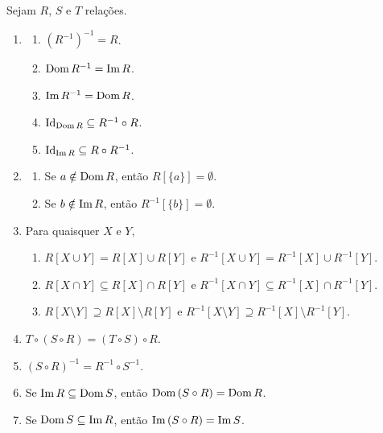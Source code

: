 \begin{proposition} \label{prop.set:relacoes}
    Sejam $R$, $S$ e $T$ relações.
        \begin{enumerate}[leftmargin=*, align=left, label=\textbf{(\alph*)}]
            \item 
                \begin{enumerate}[label=\roman*.]
                    \item $(R^{-1})^{-1} = R$.
                    \item $\operatorname{Dom} R^{-1} = \operatorname{Im} R$.
                    \item $\operatorname{Im} R^{-1} = \operatorname{Dom} R$.
                    \item $\operatorname{Id}_{\operatorname{Dom} R} \subseteq R^{-1} \circ R$.
                    \item $\operatorname{Id}_{\operatorname{Im} R} \subseteq R \circ R^{-1}$.
                \end{enumerate}
            \item 
                \begin{enumerate}[label=\roman*.]
                    \item Se $a \notin \operatorname{Dom} R$, então $R[\{a\}] = \emptyset$.
                    \item Se $b \notin \operatorname{Im} R$, então $R^{-1}[\{b\}] = \emptyset$.
                \end{enumerate}
            \item Para quaisquer $X$ e $Y$,
                \begin{enumerate}[label=\roman*.]
                    \item $R[X \cup Y] = R[X] \cup R[Y]$ e $R^{-1}[X \cup Y] = R^{-1}[X] \cup R^{-1}[Y]$.
                    \item $R[X \cap Y] \subseteq R[X] \cap R[Y]$ e $R^{-1}[X \cap Y] \subseteq R^{-1}[X] \cap R^{-1}[Y]$.
                    \item $R[X \setminus Y] \supseteq R[X] \setminus R[Y]$ e $R^{-1}[X \setminus Y] \supseteq R^{-1}[X] \setminus R^{-1}[Y]$.
                \end{enumerate}
            \item $T \circ (S \circ R) = (T \circ S) \circ R$.
            \item $(S \circ R)^{-1} = R^{-1} \circ S^{-1}$.
            \item Se $\operatorname{Im} R \subseteq \operatorname{Dom} S$, então $\operatorname{Dom} \, (S \circ R) = \operatorname{Dom} R$.
            \item Se $\operatorname{Dom} S \subseteq \operatorname{Im} R$, então $\operatorname{Im} \, (S \circ R) = \operatorname{Im} S$.
        \end{enumerate}
\end{proposition}

